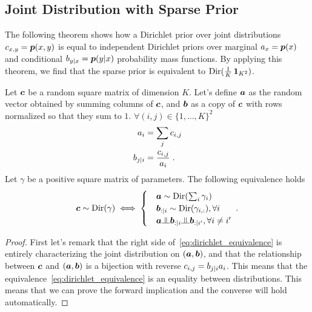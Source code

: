 \begin{subappendices}
\subsection{Joint Distribution with Sparse Prior}
\label{apdx:sparse_prior}

The following theorem shows how a Dirichlet prior over joint distributions ${c}_{x,y}= \bm{p}(x,y)$ is equal to independent Dirichlet priors over marginal ${a}_x=\bm{p}(x)$ and conditional ${b}_{y|x}=\bm{p}(y|x)$ probability mass functions. 
By applying this theorem, we find that the sparse prior is equivalent to $\mathrm{Dir}(\frac{1}{K}\operatorname{\mathbf{1}}_{K^2})$.

\begin{theorem}
    \label{thm:dir_fact}
    Let ${\bm{c}}$ be a random square matrix of dimension $K$. 
    Let's define ${\bm{a}}$ as the random vector obtained by summing columns of ${\bm{c}}$, and ${\bm{b}}$ as a copy of ${\bm{c}}$ with rows normalized so that they sum to $1$. 
    $\forall (i,j) \in \{1, \dots,K\}^2$
    \begin{align}
        {a}_i  &= \sum_j {c}_{i,j} \\
        {b}_{j|i} &= \frac{{c}_{i,j}}{{a}_i} \; .
    \end{align}
    Let $\gamma$ be a positive square matrix of parameters.
    The following equivalence holds
    \begin{align}
    \label{eq:dirichlet_equivalence}
        \vc \sim \Dir(\gamma) \iff
        \begin{cases}
            &\va \sim \Dir(\sum_i \gamma_i) \\
            &\vb_{:|i} \sim \Dir(\gamma_{i,:}), \forall i \\
            &\va \indep \vb_{:|i} \indep \vb_{:|i'}, \forall i\neq i'
        \end{cases}
        \; .
    \end{align}
\end{theorem}
\begin{proof}
First let's remark that the right side of~\eqref{eq:dirichlet_equivalence} is entirely characterizing the joint distribution on $({\bm{a}},{\bm{b}})$, and that the relationship between ${\bm{c}}$ and $({\bm{a}},{\bm{b}})$ is a bijection with reverse ${c}_{i,j} = {b}_{j|i} {a}_{i}$.
This means that the equivalence~\eqref{eq:dirichlet_equivalence} is an equality between distributions.
This means that we can prove the forward implication and the converse will hold automatically.


\end{proof}
\end{subappendices}
